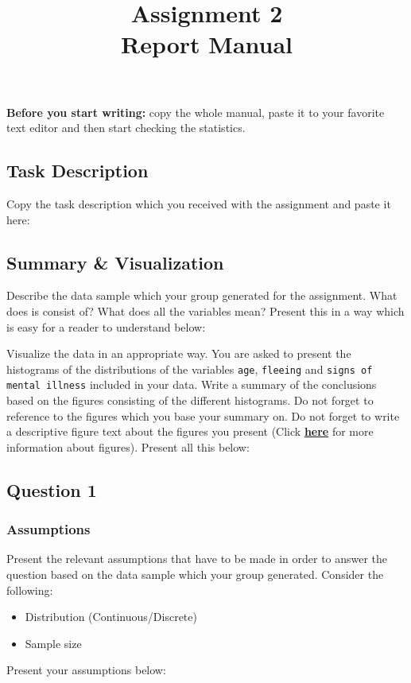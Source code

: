 \documentclass[a4paper, 10pt,serif]{article}
\title{Assignment 2\\Report Manual}
\date{}
\begin{document}
\maketitle
%
\noindent\textbf{Before you start writing:} copy the whole manual, paste it to your favorite text editor and then start checking the statistics.
\subsection*{Task Description}

Copy the task description which you received with the assignment and paste it here:

\bigskip
\bigskip
\bigskip
\bigskip

\subsection*{Summary \& Visualization}

Describe the data sample which your group generated for the assignment. What does is consist of? What does all the variables mean? Present this in a way which is easy for a reader to understand below: 

\bigskip
\bigskip
\bigskip
\bigskip

\noindent
Visualize the data in an appropriate way. You are asked to present the histograms of the distributions of the variables \texttt{age}, \texttt{fleeing}  and \texttt{signs of mental illness} included in your data. Write a summary of the conclusions based on the figures consisting of the different histograms. Do not forget to reference to the figures which you base your summary on. Do not forget to write a descriptive figure text about the figures you present (Click \href{https://writingcenter.unc.edu/tips-and-tools/figures-and-charts/}{\textbf{here}} for more information about figures). Present all this below:

\newpage
\subsection*{Question 1}

\subsubsection*{Assumptions}


Present the relevant assumptions that have to be made in order to answer the question based on the data sample which your group generated. 
Consider the following:
\begin{itemize}
    \item Distribution (Continuous/Discrete)
    \item Sample size
\end{itemize}
Present your assumptions below:
\end{document}
